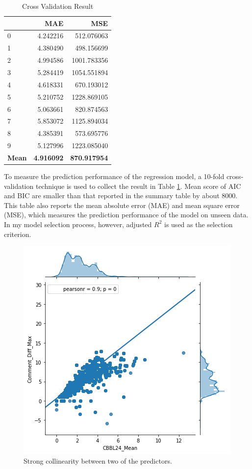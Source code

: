 \documentclass[]{article}
\begin{document}
\begin{table}
\centering
\begin{tabular}{lrr}
	\toprule
	{} &           \textbf{MAE} &       \textbf{MSE} \\
	\midrule
	0 &  4.242216 &   512.076063 \\
	1 &  4.380490 &   498.156699 \\
	2 &  4.994586 &  1001.783356 \\
	3 &  5.284419 &  1054.551894 \\
	4 &  4.618331 &   670.193012 \\
	5 &  5.210752 &  1228.869105 \\
	6 &  5.063661 &   820.874563 \\
	7 &  5.853072 &  1125.894034 \\
	8 &  4.385391 &   573.695776 \\
	9 &  5.127996 &  1223.085040 \\
	\textbf{Mean}  &   \textbf{4.916092} &   \textbf{870.917954} \\
	\bottomrule
\end{tabular}

\caption{Cross Validation Result}
\label{tab:cv_result}
\end{table}

To measure the prediction performance of the regression model, a 10-fold cross-validation technique is used to collect the result in Table \ref{tab:cv_result}. Mean score of AIC and BIC are smaller than that reported in the summary table by about 8000. This table also reports the mean absolute error (MAE) and mean square error (MSE), which measures the prediction performance of the model on unseen data. In my model selection process, however, adjusted $R^2$ is used as the selection criterion. 
%
\begin{figure}[hbtp]
	\centering
	\includegraphics[width=.6\columnwidth]{../Figures/predictor_corr_1}
	\caption{Strong collinearity between two of the predictors.}
	\label{fig:predictor_corr_1}
\end{figure}
%
\end{document}

